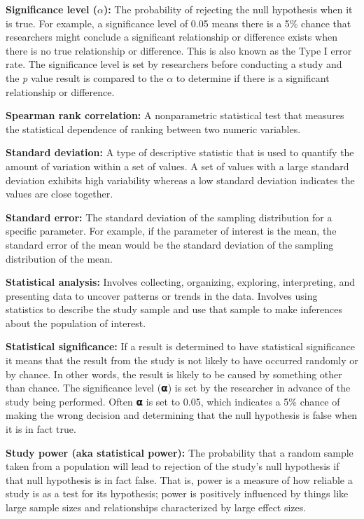 \documentclass[
]{book}
\begin{document}
\textbf{Significance level (\(\alpha\)):} The probability of rejecting the null hypothesis when it is true. For example, a significance level of 0.05 means there is a 5\% chance that researchers might conclude a significant relationship or difference exists when there is no true relationship or difference. This is also known as the Type I error rate. The significance level is set by researchers before conducting a study and the \emph{p} value result is compared to the \(\alpha\) to determine if there is a significant relationship or difference.

\textbf{Spearman rank correlation:} A nonparametric statistical test that measures the statistical dependence of ranking between two numeric variables.

\textbf{Standard deviation:} A type of descriptive statistic that is used to quantify the amount of variation within a set of values. A set of values with a large standard deviation exhibits high variability whereas a low standard deviation indicates the values are close together.

\textbf{Standard error:} The standard deviation of the sampling distribution for a specific parameter. For example, if the parameter of interest is the mean, the standard error of the mean would be the standard deviation of the sampling distribution of the mean.

\textbf{Statistical analysis:} Involves collecting, organizing, exploring, interpreting, and presenting data to uncover patterns or trends in the data. Involves using statistics to describe the study sample and use that sample to make inferences about the population of interest.

\textbf{Statistical significance:} If a result is determined to have statistical significance it means that the result from the study is not likely to have occurred randomly or by chance. In other words, the result is likely to be caused by something other than chance. The significance level (𝝰) is set by the researcher in advance of the study being performed. Often 𝝰 is set to 0.05, which indicates a 5\% chance of making the wrong decision and determining that the null hypothesis is false when it is in fact true.

\textbf{Study power (aka statistical power):} The probability that a random sample taken from a population will lead to rejection of the study's null hypothesis if that null hypothesis is in fact false. That is, power is a measure of how reliable a study is as a test for its hypothesis; power is positively influenced by things like large sample sizes and relationships characterized by large effect sizes.
\end{document}
